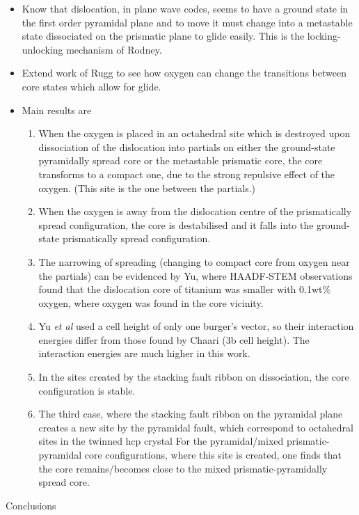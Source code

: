 \documentclass[a4paper,11pt]{article}
\numberwithin{equation}{chapter}
\numberwithin{listing}{chapter}
\begin{document}
\begin{itemize}
\item Know that dislocation, in plane wave codes, seems to have a
ground state in the first order pyramidal plane and to move it
must change into a metastable state dissociated on the prismatic
plane to glide easily. This is the locking-unlocking mechanism of
Rodney.
\item Extend work of Rugg to see how oxygen can change the transitions
between core states which allow for glide.

\item Main results are
\begin{enumerate}
\item When the oxygen is placed in an octahedral site which is
destroyed upon dissociation of the dislocation into partials on either the
ground-state pyramidally spread core or the metastable
prismatic core, the core transforms to a compact
one, due to the strong repulsive effect of the oxygen. (This
site is the one between the partials.)
\item When the oxygen is away from the dislocation centre of the prismatically
spread configuration, the core is destabilised and it falls
into the ground-state prismatically spread configuration.
\item The narrowing of spreading (changing to compact core from
oxygen near the partials) can be evidenced by Yu, where
HAADF-STEM observations found that the dislocation core of
titanium was smaller with 0.1wt\% oxygen, where oxygen was
found in the core vicinity.
\item Yu \emph{et al} used a cell height of only one burger's vector, so
their interaction energies differ from those found by Chaari
(3b cell height). The interaction energies are much higher in
this work.
\item In the sites created by the stacking fault ribbon on
dissociation, the core configuration is stable.
\item The third case, where the stacking fault ribbon on the
pyramidal plane creates a new site by the pyramidal fault,
which correspond to octahedral sites in the twinned hcp
crystal For the pyramidal/mixed prismatic-pyramidal core
configurations, where this site is created, one finds that the
core remains/becomes close to the mixed prismatic-pyramidally
spread core.
\end{enumerate}
\end{itemize}

Conclusions
\end{document}
